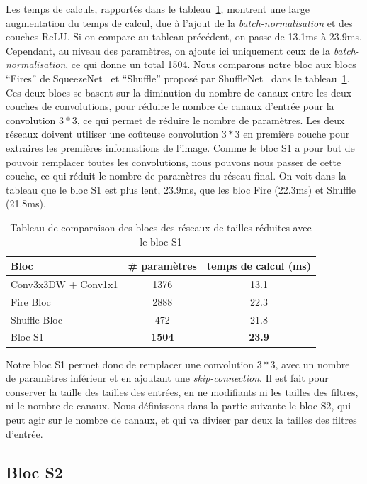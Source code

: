 Les temps de calculs, rapportés dans le tableau~\ref{tab:blocS1}, montrent une large augmentation du temps de calcul, due à l'ajout de la \textit{batch-normalisation} et des couches ReLU.
Si on compare au tableau précédent, on passe de 13.1ms à 23.9ms.
Cependant, au niveau des paramètres, on ajoute ici uniquement ceux de la \textit{batch-normalisation}, ce qui donne un total 1504. 
Nous comparons notre bloc aux blocs ``Fires'' de SqueezeNet~\cite{iandola2016squeezenet} et ``Shuffle'' proposé par ShuffleNet~\cite{zhang2017shufflenet} dans le tableau~\ref{tab:blocS1}.
Ces deux blocs se basent sur la diminution du nombre de canaux entre les deux couches de convolutions, pour réduire le nombre de canaux d'entrée pour la convolution $3*3$, ce qui permet de réduire le nombre de paramètres.
Les deux réseaux doivent utiliser une coûteuse convolution $3*3$ en première couche pour extraires les premières informations de l'image.
Comme le bloc S1 a pour but de pouvoir remplacer toutes les convolutions, nous pouvons nous passer de cette couche, ce qui réduit le nombre de paramètres du réseau final.
On voit dans la tableau que le bloc S1 est plus lent, 23.9ms, que les bloc Fire (22.3ms) et Shuffle (21.8ms).
 

\begin{table}[h]
\centering
\begin{tabular}{|l|c|c|}
\hline
Bloc & \# paramètres & temps de calcul (ms) \\
\hline
\hline
Conv3x3DW + Conv1x1 & 1376 & 13.1 \\
\hline
Fire Bloc & 2888 & 22.3 \\
\hline
Shuffle Bloc & 472 & 21.8 \\
\hline
Bloc S1 & \textbf{1504} & \textbf{23.9}\\
\hline
\end{tabular}
\caption{Tableau de comparaison des blocs des réseaux de tailles réduites avec le bloc S1}
\label{tab:blocS1}
\end{table}

Notre bloc S1 permet donc de remplacer une convolution $3*3$, avec un nombre de paramètres inférieur et en ajoutant une \textit{skip-connection}.
Il est fait pour conserver la taille des tailles des entrées, en ne modifiants ni les tailles des filtres, ni le nombre de canaux.
Nous définissons dans la partie suivante le bloc S2, qui peut agir sur le nombre de canaux, et qui va diviser par deux la tailles des filtres d'entrée.


\subsection{Bloc S2}
\label{sec:S2}


